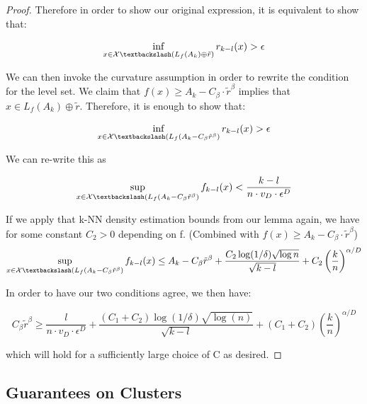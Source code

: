 \begin{proof}
Therefore in order to show our original expression, it is equivalent to show that:

\begin{equation*}
    \inf\limits_{x\in\mathcal{X} \textbackslash (L_{f}(A_k)\oplus\tilde{r})} r_{k-l}(x)>\epsilon
\end{equation*}

We can then invoke the curvature assumption in order to rewrite the condition for the level set. We claim that $f(x)\geq A_k-C_{\beta}\cdot\tilde{r}^{\beta}$ implies that $x \in L_{f}(A_k) \oplus \tilde{r}$. Therefore, it is enough to show that:

\begin{equation*}
    \inf\limits_{x\in\mathcal{X} \textbackslash (L_{f}(A_k - C_{\beta}\tilde{r}^{\beta})} r_{k-l}(x)>\epsilon
\end{equation*}

We can re-write this as

\begin{equation*}
    \sup\limits_{x\in\mathcal{X} \textbackslash (L_{f}(A_k - C_{\beta}\tilde{r}^{\beta})} f_{k-l}(x)<\frac{k-l}{n\cdot v_D\cdot \epsilon^D}
\end{equation*}

If we apply that k-NN density estimation bounds from our lemma again, we have for some constant $C_2>0$ depending on f. (Combined with $f(x)\geq A_k - C_{\beta}\cdot\tilde{r}^{\beta}$)
\begin{equation*}
    \sup\limits_{x\in\mathcal{X} \textbackslash (L_{f}(A_k - C_{\beta}\tilde{r}^{\beta})} f_{k-l}(x)\leq A_k - C_{\beta}\tilde{r}^{\beta}+ \frac{C_2\log(1/\delta)\sqrt{\log n}}{\sqrt{k-l}} + C_2\left(\frac{k}{n}\right)^{\alpha/D}
\end{equation*}

In order to have our two conditions agree, we then have:

\begin{equation*}
    C_{\beta}\tilde{r}^{\beta} \geq \frac{l}{n\cdot v_D\cdot \epsilon^D} + \frac{(C_1+C_2)\log(1/\delta)\sqrt{\log(n)}}{\sqrt{k-l}} + (C_1+C_2)\left(\frac{k}{n}\right)^{\alpha/D}
\end{equation*}

which will hold for a sufficiently large choice of C as desired.
\end{proof}
\subsection{Guarantees on Clusters}

